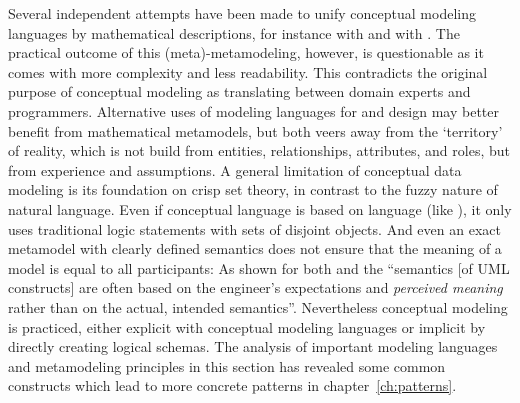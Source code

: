 Several independent attempts have been made to unify conceptual modeling
languages by mathematical descriptions, for instance with  \cite{Frederiks1997} and with 
\cite{Keet2008b}. The practical outcome of this (meta)-metamodeling, however,
is questionable as it comes with more complexity and less readability.  This
contradicts the original purpose of conceptual modeling as translating between
domain experts and programmers. Alternative uses of modeling languages for
 and  design may better benefit
from mathematical metamodels, but both veers away from the `territory' of
reality, which is not build from entities, relationships, attributes, and
roles, but from experience and assumptions.  A general limitation of conceptual
data modeling is its foundation on crisp set theory, in contrast to the fuzzy
nature of natural language. Even if conceptual language is based on language
(like ), it only uses traditional logic statements with sets of
disjoint objects. And even an exact metamodel with clearly defined semantics
does not ensure that the meaning of a model is equal to all participants: As
shown for both  \textcite{Hitchman1995} and 
\cite{Oliver2006} the ``semantics [of UML constructs] are often based on the
engineer’s expectations and {\em perceived meaning} rather than on the actual,
intended semantics''.  Nevertheless conceptual modeling is practiced, either
explicit with conceptual modeling languages or implicit by directly creating
logical schemas. The analysis of important modeling languages and metamodeling
principles in this section has revealed some common constructs which lead to
more concrete patterns in chapter~\ref{ch:patterns}.


